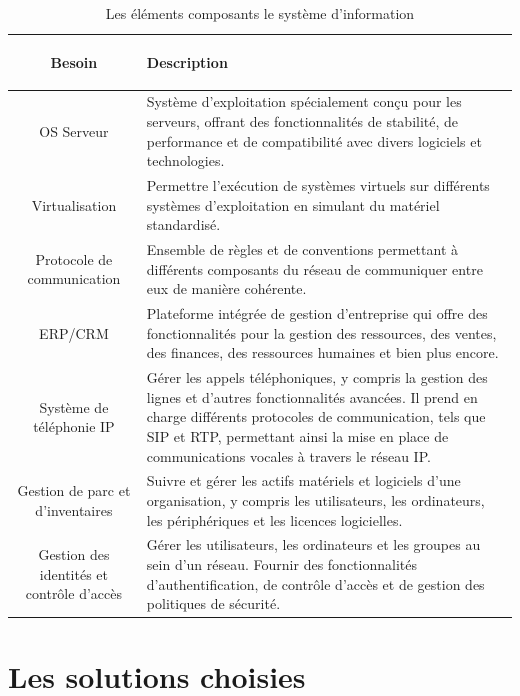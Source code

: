 \begin{table}[H]
\begin{center}
\begin{tabular}{|c{3cm}|l{10cm}|}
\hline
\textbf{Besoin} & \begin{center} \textbf{Description} \end{center} \\
\hline
OS Serveur & Système d'exploitation spécialement conçu pour les serveurs, offrant des fonctionnalités de stabilité, de performance et de compatibilité avec divers logiciels et technologies. \\
\hline
Virtualisation & Permettre l'exécution de systèmes virtuels sur différents systèmes d'exploitation en simulant du matériel standardisé. \\
\hline
Protocole de communication & Ensemble de règles et de conventions permettant à différents composants du réseau de communiquer entre eux de manière cohérente. \\
\hline
ERP/CRM & Plateforme intégrée de gestion d'entreprise qui offre des fonctionnalités pour la gestion des ressources, des ventes, des finances, des ressources humaines et bien plus encore. \\
\hline
Système de téléphonie IP & Gérer les appels téléphoniques, y compris la gestion des lignes et d'autres fonctionnalités avancées. Il prend en charge différents protocoles de communication, tels que SIP et RTP, permettant ainsi la mise en place de communications vocales à travers le réseau IP. \\
\hline
Gestion de parc et d'inventaires & Suivre et gérer les actifs matériels et logiciels d'une organisation, y compris les utilisateurs, les ordinateurs, les périphériques et les licences logicielles. \\
\hline
Gestion des identités et contrôle d'accès & Gérer les utilisateurs, les ordinateurs et les groupes au sein d'un réseau. Fournir des fonctionnalités d'authentification, de contrôle d'accès et de gestion des politiques de sécurité. \\
\hline
\end{tabular}
\caption{Les éléments composants le système d'information}
\label{1}
\end{center}
\end{table}


\section{Les solutions choisies}

